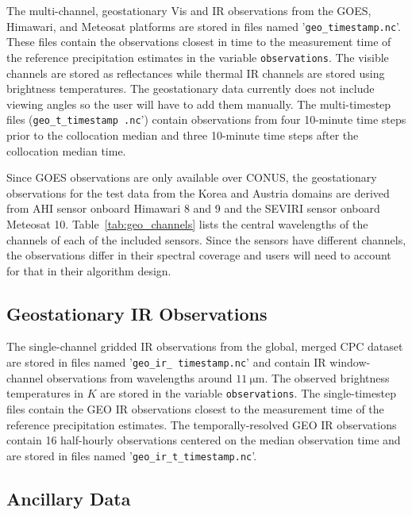 \documentclass[11pt]{article}
\begin{document}
The multi-channel, geostationary Vis and IR observations from the GOES,
Himawari, and Meteosat platforms are stored in files named
'\texttt{geo\_\textlangle timestamp\textrangle.nc}'. These files contain the
observations closest in time to the measurement time of the reference
precipitation estimates in the variable \texttt{observations}. The visible
channels are stored as reflectances while thermal IR channels are stored using
brightness temperatures. The geostationary data currently does not include
viewing angles so the user will have to add them manually. The multi-timestep
files (\texttt{geo\_t\_\textlangle timestamp \textrangle.nc}') contain
observations from four 10-minute time steps prior to the collocation median and
three 10-minute time steps after the collocation median time.

Since GOES observations are only available over CONUS, the geostationary
observations for the test data from the Korea and Austria domains are derived
from AHI sensor onboard Himawari 8 and 9 and the SEVIRI sensor onboard Meteosat
10. Table~\ref{tab:geo_channels} lists the central wavelengths of the
channels of each of the included sensors. Since the sensors have different
channels, the observations differ in their spectral coverage and users will need
to account for that in their algorithm design.

\subsection{Geostationary IR Observations}

The single-channel gridded IR observations from the global, merged CPC dataset
\citep{NCEP_CPC_L3_IR} are stored in files named '\texttt{geo\_ir\_\textlangle
	timestamp\textrangle.nc}' and contain IR window-channel observations from
wavelengths around $\SI{11}{\micro \meter}$. The observed brightness
temperatures in $\si{K}$ are stored in the variable \texttt{observations}. The
single-timestep files contain the GEO IR observations closest to the
measurement time of the reference precipitation estimates. The
temporally-resolved GEO IR observations contain 16 half-hourly observations
centered on the median observation time and are stored in files named
'\texttt{geo\_ir\_t\_\textlangle timestamp\textrangle.nc}'.

\subsection{Ancillary Data}
\end{document}

